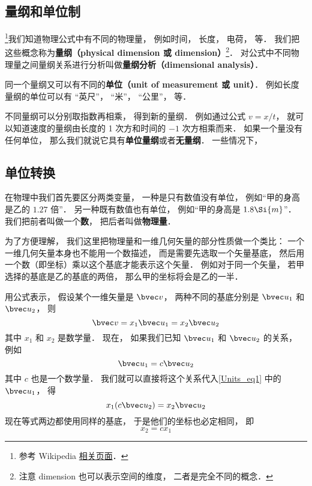 
\subsection{量纲和单位制}
\footnote{参考 Wikipedia \href{https://en.wikipedia.org/wiki/Dimensional_analysis}{相关页面}．}我们知道物理公式中有不同的物理量， 例如时间， 长度， 电荷， 等． 我们把这些概念称为\textbf{量纲（physical dimension 或 dimension）}\footnote{注意 dimension 也可以表示空间的维度， 二者是完全不同的概念．}． 对公式中不同物理量之间量纲关系进行分析叫做\textbf{量纲分析（dimensional analysis）}．

同一个量纲又可以有不同的\textbf{单位（unit of measurement 或 unit）}． 例如长度量纲的单位可以有 “英尺”， “米”， “公里”， 等．

不同量纲可以分别取指数再相乘， 得到新的量纲． 例如通过公式 $v = x/t$， 就可以知道速度的量纲由长度的 1 次方和时间的 $-1$ 次方相乘而来． 如果一个量没有任何单位， 那么我们就说它具有\textbf{单位量纲}或者\textbf{无量纲}． 一些情况下， 

\subsection{单位转换}


在物理中我们首先要区分两类变量， 一种是只有数值没有单位， 例如“甲的身高是乙的 $1.27$ 倍”． 另一种既有数值也有单位， 例如“甲的身高是 $1.8\Si{m}$”． 我们把前者叫做一个\textbf{数}， 把后者叫做\textbf{物理量}．

为了方便理解， 我们这里把物理量和一维几何矢量的部分性质做一个类比： 一个一维几何矢量本身也不能用一个数描述， 而是需要先选取一个矢量基底， 然后用一个数（即坐标）乘以这个基底才能表示这个矢量． 例如对于同一个矢量， 若甲选择的基底是乙的基底的两倍， 那么甲的坐标将会是乙的一半．

用公式表示， 假设某个一维矢量是 $\bvec v$， 两种不同的基底分别是 $\bvec u_1$ 和 $\bvec u_2$， 则
\begin{equation}\label{Units_eq1}
\bvec v = x_1 \bvec u_1 = x_2 \bvec u_2
\end{equation}
其中 $x_1$ 和 $x_2$ 是数学量． 现在， 如果我们已知 $\bvec u_1$ 和 $\bvec u_2$ 的关系， 例如
\begin{equation}\label{Units_eq2}
\bvec u_1 = c \bvec u_2
\end{equation}
其中 $c$ 也是一个数学量． 我们就可以直接将这个关系代入\autoref{Units_eq1} 中的 $\bvec u_1$， 得
\begin{equation}
x_1 (c \bvec u_2) = x_2 \bvec u_2
\end{equation}
现在等式两边都使用同样的基底， 于是他们的坐标也必定相同， 即
\begin{equation}
x_2 = c x_1
\end{equation}

